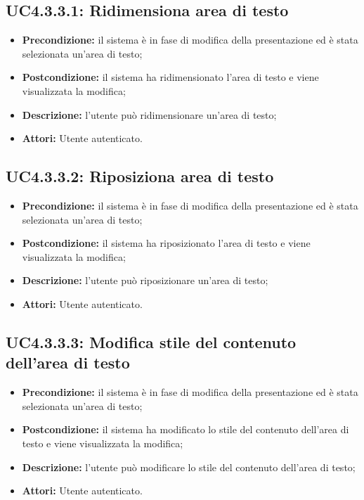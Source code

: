 \subsection{ UC4.3.3.1: Ridimensiona area di testo}

\begin{itemize}
	\item \textbf{Precondizione:} il sistema è in fase di modifica della presentazione ed è stata selezionata un'area di testo;
	\item \textbf{Postcondizione:} il sistema ha ridimensionato l'area di testo e viene visualizzata la modifica;
	\item \textbf{Descrizione:} l'utente può ridimensionare un'area di testo;
	\item \textbf{Attori:} Utente autenticato.
\end{itemize}
\subsection{ UC4.3.3.2: Riposiziona area di testo}

\begin{itemize}
	\item \textbf{Precondizione:} il sistema è in fase di modifica della presentazione ed è stata selezionata un'area di testo;
	\item \textbf{Postcondizione:} il sistema ha riposizionato l'area di testo e viene visualizzata la modifica;
	\item \textbf{Descrizione:} l'utente può riposizionare un'area di testo;
	\item \textbf{Attori:} Utente autenticato.
\end{itemize}
\subsection{ UC4.3.3.3: Modifica stile del contenuto dell'area di testo}

\begin{itemize}
	\item \textbf{Precondizione:} il sistema è in fase di modifica della presentazione ed è stata selezionata un'area di testo;
	\item \textbf{Postcondizione:} il sistema ha modificato lo stile del contenuto dell'area di testo e viene visualizzata la modifica;
	\item \textbf{Descrizione:} l'utente può modificare lo stile del contenuto dell'area di testo;
	\item \textbf{Attori:} Utente autenticato.
\end{itemize}
